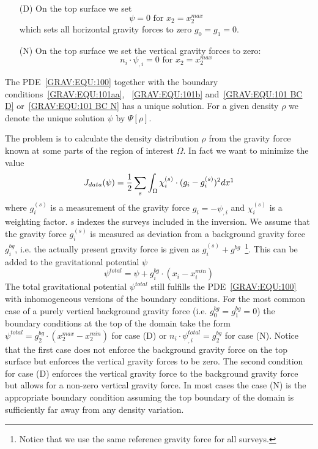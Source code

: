 \begin{itemize}
 \item[(D)] 
On the top surface we set 
\begin{equation}\label{GRAV:EQU:101 BC D}
\psi = 0 \mbox{ for } x_2=x^{max}_2
\end{equation} 
which sets all horizontal gravity forces to zero $g_0=g_1=0$.
 \item[(N)] 
On the top surface we set the vertical gravity forces to zero:
\begin{equation}\label{GRAV:EQU:101 BC N}
n_i \cdot  \psi_{,i} = 0 \mbox{ for } x_2=x^{max}_2
\end{equation} 
\end{itemize}
The PDE~\ref{GRAV:EQU:100} together with the boundary conditions~\ref{GRAV:EQU:101aa}, ~\ref{GRAV:EQU:101b}
and~\ref{GRAV:EQU:101 BC D} or~\ref{GRAV:EQU:101 BC N}
has a unique solution. For a given density $\rho$ we denote the unique solution $\psi$ by $\Psi[\rho]$.


The problem is to calculate the density distribution $\rho$ from the gravity force known at some parts of the region of interest 
$\Omega$. In fact we want to minimize the value
\begin{equation}\label{GRAV:EQU:102}
J_{data}(\psi) = \frac{1}{2}\sum_{s} \int_{\Omega} \chi^{(s)}_i \cdot (  g_{i}- g^{(s)}_i)^2 dx
\footnote{Summation over $i$ is performed by Einstein notation.}
\end{equation} 
where $g^{(s)}_i$ is a measurement of the gravity force $g_i=-\psi_{,i}$ and $\chi^{(s)}_i$ is a weighting factor. 
$s$ indexes the surveys included in the inversion. 
We assume that the gravity force $g^{(s)}_i$ is measured as deviation from a background gravity force $g^{bg}_i$,
i.e. the actually present gravity force is given as  $g^{(s)}_i + g^{bg}$~\footnote{Notice that we use the same reference gravity force for all surveys.}.
This can be added to the 
gravitational potential $\psi$ 
\begin{equation}\label{GRAV:EQU:102x}
\psi^{total} = \psi + g^{bg}_i \cdot ( x_i - x^{min}_i ) 
\end{equation}
The total gravitational potential $\psi^{total}$ still fulfills the PDE~\ref{GRAV:EQU:100} 
with inhomogeneous versions of the boundary conditions. For the most common case of a purely vertical
background gravity force (i.e. $g^{bg}_0=g^{bg}_1=0$) the boundary conditions at the top of the domain
take the form $\psi^{total} =g^{bg}_2 \cdot ( x_2^{max} - x^{min}_2 )$ for case (D) or
$n_i \cdot  \psi^{total}_{,i} =g^{bg}_2$ for case (N). Notice that the first case does not enforce
the background gravity force on the top surface but enforces the vertical gravity forces to be zero. 
The second condition for case (D) enforces the vertical gravity force to the background gravity force but allows 
for a non-zero vertical gravity force. In most cases the case (N) is the appropriate boundary condition
assuming the top boundary of the domain is sufficiently far away from any density variation.   
 

